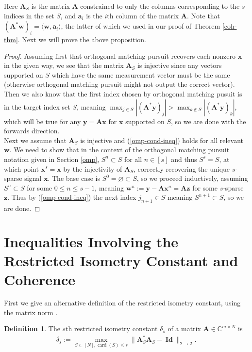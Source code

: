 \documentclass[12pt,a4paper]{amsart}
\numberwithin{equation}{section}
\theoremstyle{plain}
\theoremstyle{definition}
\newtheorem{Def}[Th]{Definition}
\newcommand{\BC}{\mathbb C}
\newcommand{\bdy}{\mathbf{y}}
\newcommand{\bdx}{\mathbf{x}}
\newcommand{\bdz}{\mathbf{z}}
\newcommand{\bda}{\mathbf{a}}
\newcommand{\bdw}{\mathbf{w}}
\newcommand{\bdA}{\mathbf{A}}
\DeclareMathOperator{\card}{card}
\DeclareMathOperator{\Id}{\mathbf{Id}}
\begin{document}
\begin{appendices}
Here $\bdA_S$ is the matrix $\bdA$ constrained to only the columns corresponding to the $s$ indices in the set $S$, and $\bda_i$ is the $i$th column of the matrix $\bdA$. Note that $(\bdA^*\bdw)_i=\langle\bdw,\bda_i\rangle$, the latter of which we used in our proof of Theorem \ref{coh-thm}. Next we will prove the above proposition.

\begin{proof}
    Assuming first that orthogonal matching pursuit recovers each nonzero $\bdx$ in the given way, we see that the matrix $\bdA_S$ is injective since any vectors supported on $S$ which have the same measurement vector must be the same (otherwise orthogonal matching pursuit might not output the correct vector). Then we also know that the first index chosen by orthogonal matching pusuit is in the target index set $S$, meaning $\max_{j\in S}|(\bdA^*\bdy)_j|>\max_{k\notin S}|(\bdA^*\bdy)_k|$, which will be true for any $\bdy=\bdA\bdx$ for $\bdx$ supported on $S$, so we are done with the forwards direction.\\
    
    Next we assume that $\bdA_S$ is injective and (\ref{omp-cond-ineq}) holds for all relevant $\bdw$. We need to show that in the context of the orthogonal matching pursuit notation given in Section \ref{omp}, $S^n\subset S$ for all $n\in[s]$ and thus $S^s=S$, at which point $\bdx^s=\bdx$ by the injectivity of $\bdA_S$, correctly recovering the unique $s$-sparse signal $\bdx$. The base case is $S^0=\varnothing\subset S$, so we proceed inductively, assuming $S^n\subset S$ for some $0\leq n\leq s-1$, meaning $\bdw^n:=\bdy-\bdA\bdx^n=\bdA\bdz$ for some $s$-sparse $\bdz$. Thus by (\ref{omp-cond-ineq}) the next index $j_{n+1}\in S$ meaning $S^{n+1}\subset S$, so we are done.
\end{proof}

\section{Inequalities Involving the Restricted Isometry Constant and Coherence}\label{coh-ric}

First we give an alternative definition of the restricted isometry constant, using the matrix norm \cite{fou-rau}.

\begin{Def}\label{ric-alt} The $s$th restricted isometry constant $\delta_s$ of a matrix $\bdA\in\BC^{m\times N}$ is
\begin{align*}
    \delta_s:=\max_{S\subset[N],\card(S)\leq s}\|\bdA_S^*\bdA_S-\Id\|_{2\rightarrow2}.
\end{align*}
\end{Def}


\end{appendices}
\end{document}

